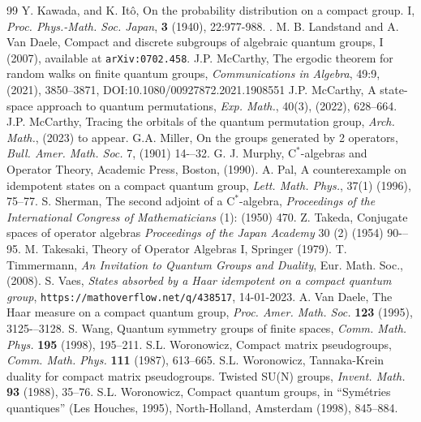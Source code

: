 \documentclass[12pt]{amsart}
\theoremstyle{remark}
\theoremstyle{remark}
\begin{document}
\begin{thebibliography}{99}
Y. Kawada, and K. It\^{o}, On the probability distribution on a compact group. I, \emph{Proc. Phys.-Math. Soc. Japan}, \textbf{3} (1940), 22:977-988. .
M. B. Landstand and A. Van Daele, Compact and discrete subgroups of algebraic quantum groups, I
(2007), available at \texttt{arXiv:0702.458}.
J.P. McCarthy, The ergodic theorem for random walks on finite quantum groups, \emph{Communications in Algebra}, 49:9, (2021), 3850--3871, DOI:10.1080/00927872.2021.1908551
J.P. McCarthy, A state-space approach to quantum permutations, \emph{Exp. Math.}, 40(3), (2022), 628--664.
J.P. McCarthy, Tracing the orbitals of the quantum permutation group, \emph{Arch. Math.}, (2023) to appear.
G.A. Miller, On the groups generated by 2 operators, \emph{Bull. Amer. Math. Soc.} 7, (1901) 14-–32.
G. J. Murphy, $\mathrm{C}^\ast$-algebras and Operator Theory, Academic Press, Boston, (1990).
A. Pal, A counterexample on idempotent states on a compact quantum group, \emph{Lett. Math. Phys.}, 37(1) (1996), 75--77.
S. Sherman, The second adjoint of a $\mathrm{C}^\ast$-algebra, \emph{Proceedings of the International Congress of Mathematicians} (1): (1950) 470.
Z. Takeda, Conjugate spaces of operator algebras \emph{Proceedings of the Japan Academy} 30 (2) (1954) 90-–95.
M. Takesaki, Theory of Operator Algebras I, Springer (1979).
T. Timmermann, \emph{An Invitation to Quantum Groups and Duality}, Eur. Math. Soc., (2008).
 S. Vaes, \emph{States absorbed by a Haar idempotent on a compact quantum group}, \texttt{https://mathoverflow.net/q/438517}, 14-01-2023.
A. Van Daele, The Haar measure on a compact quantum group, \emph{Proc. Amer. Math. Soc.} \textbf{123}
(1995), 3125-–3128.
S. Wang, Quantum symmetry groups of finite spaces, {\em Comm. Math. Phys.} {\bf 195} (1998), 195--211.
S.L. Woronowicz, Compact matrix pseudogroups, {\em Comm. Math. Phys.} {\bf 111} (1987), 613--665.
S.L. Woronowicz, Tannaka-Krein duality for compact matrix pseudogroups. Twisted SU(N) groups, {\em Invent. Math.} {\bf 93} (1988), 35--76.
S.L. Woronowicz, Compact quantum groups, in ``Sym\'etries quantiques'' (Les Houches, 1995), North-Holland, Amsterdam (1998), 845--884.
\end{thebibliography}
\end{document}
